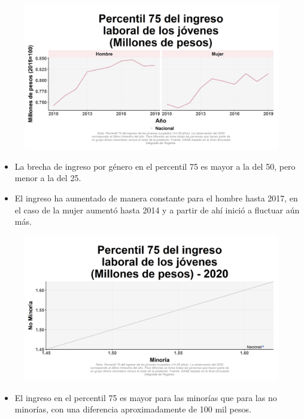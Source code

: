     \begin{figure}[H]
        \caption[Percentil 75 del ingreso laboral de los jóvenes por género ]{\label{inglab75jov_gen_trend} }
        \begin{center}
        \includegraphics[width=\textwidth,keepaspectratio]{img/var_32_trend.png}
        \end{center}
    \end{figure}
            \begin{itemize}
                \item La brecha de ingreso por género en el percentil 75 es mayor a la del 50, pero menor a la del 25.
                \item El ingreso ha aumentado de manera constante para el hombre hasta 2017, en el caso de la mujer aumentó hasta 2014 y a partir de ahí inició a fluctuar aún más.
                \end{itemize}

    \begin{figure}[H]
        \caption[Percentil 75 del ingreso laboral de los jóvenes por minorías y no minorías para 2020 ]{\label{inglab75jov_minoria_scatter} }
        \begin{center}
        \includegraphics[width=\textwidth,keepaspectratio]{img/var_31_scatter.png}
        \end{center}
    \end{figure}
            \begin{itemize}
                \item El ingreso en el percentil 75 es mayor para las minorías que para las no minorías, con una diferencia aproximadamente de 100 mil pesos.
                \end{itemize}

